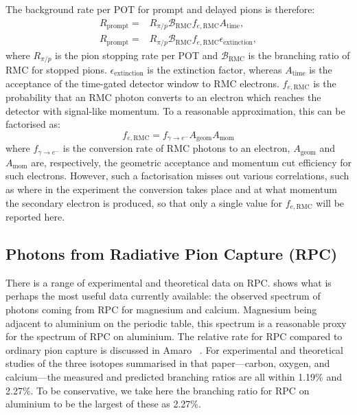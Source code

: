 The background rate per \ac{POT} for prompt and delayed pions is therefore:
\begin{align}
	R_\textrm{prompt}=&R_{\pi/p}\mathcal{B}_\textrm{RMC}f_{e,\textrm{RMC}}A_\textrm{time}, \\
	R_\textrm{prompt}=&R_{\pi/p}\mathcal{B}_\textrm{RMC}f_{e,\textrm{RMC}}\epsilon_\textrm{extinction},
\end{align}
where $R_{\pi/p}$ is the pion stopping rate per \ac{POT} and $\mathcal{B}_\textrm{RMC}$ is the branching ratio of \ac{RMC} for stopped pions.
$\epsilon_\textrm{extinction}$ is the extinction factor, whereas $A_\textrm{time}$ is the acceptance of the time-gated detector window to RMC electrons.
$f_{e,\textrm{RMC}}$ is the probability that an RMC photon converts to an electron which reaches the detector with signal-like momentum.
To a reasonable approximation, this can be factorised as:
\begin{equation}
f_{e,\textrm{RMC}}=f_{\gamma\rightarrow{}e^-}A_\textrm{geom}A_\textrm{mom}
\end{equation}
where $f_{\gamma\rightarrow{}e^-}$ is the conversion rate of RMC photons to an electron, $A_\textrm{geom}$ and $A_\textrm{mom}$
are, respectively, the geometric acceptance and momentum cut efficiency for such electrons.
However, such a factorisation misses out various correlations, such as where in the experiment the conversion takes place and at what momentum the secondary electron is produced, so that only a single value for $f_{e,\textrm{RMC}}$ will be reported here.

\FigRPCData
\subsection{Photons from Radiative Pion Capture (\acs{RPC})}
There is a range of experimental and theoretical data on \ac{RPC}. 
 shows what is perhaps the most useful data currently available: the observed spectrum of photons coming from RPC for magnesium and calcium.
Magnesium being adjacent to aluminium on the periodic table, this spectrum is a reasonable proxy for the spectrum of \ac{RPC} on aluminium.
The relative rate for \ac{RPC} compared to ordinary pion capture is discussed in Amaro \etal~\cite{Amaro:1997ed}.
For experimental and theoretical studies of the three isotopes summarised in that paper---carbon, oxygen, and calcium---the measured and predicted branching ratios are all within 1.19\% and 2.27\%.
To be conservative, we take here the branching ratio for RPC on aluminium to be the largest of these as 2.27\%.

